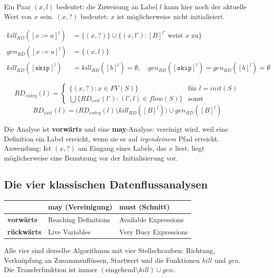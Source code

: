 \documentclass[12pt, a4paper]{article}
\begin{document}
\begin{definitionbox}
Ein Paar $(x, l)$ bedeutet: die Zuweisung an Label $l$ kann hier noch der aktuelle
Wert von $x$ sein. $(x, ?)$ bedeutet: $x$ ist möglicherweise nicht initialisiert.
\end{definitionbox}

\[
\begin{aligned}
kill_{RD}([x := a]^l) &= \{(x,?)\} \cup \{(x,l') : [B]^{l'} \text{ weist } x \text{ zu}\} \\
gen_{RD}([x := a]^l) &= \{(x,l)\} \\
kill_{RD}([\texttt{skip}]^l) &= kill_{RD}([b]^l) = \emptyset,\quad
gen_{RD}([\texttt{skip}]^l) = gen_{RD}([b]^l) = \emptyset
\end{aligned}
\]

\[
RD_{entry}(l) =
\begin{cases}
\{(x,?) : x \in FV(S)\} & \text{für } l = init(S)\\
\bigcup \{RD_{exit}(l') : (l',l) \in flow(S)\} & \text{sonst}
\end{cases}
\]
\[
RD_{exit}(l) = \bigl(RD_{entry}(l) \setminus kill_{RD}([B]^l)\bigr) \cup gen_{RD}([B]^l)
\]

Die Analyse ist \textbf{vorwärts} und eine \textbf{may}-Analyse: vereinigt wird, weil
eine Definition ein Label erreicht, wenn sie es auf \emph{irgendeinem} Pfad erreicht.
Anwendung: Ist $(x,?)$ am Eingang eines Labels, das $x$ liest, liegt möglicherweise
eine Benutzung vor der Initialisierung vor.

\subsection{Die vier klassischen Datenflussanalysen}

\begin{center}
\begin{tabular}{lll}
\hline
 & \textbf{may} (Vereinigung) & \textbf{must} (Schnitt) \\
\hline
\textbf{vorwärts}  & Reaching Definitions & Available Expressions \\
\textbf{rückwärts} & Live Variables & Very Busy Expressions \\
\hline
\end{tabular}
\end{center}

Alle vier sind derselbe Algorithmus mit vier Stellschrauben: Richtung, Verknüpfung an
Zusammenflüssen, Startwert und die Funktionen $kill$ und $gen$. Die Transferfunktion
ist immer $(\text{eingehend} \setminus kill) \cup gen$.
\end{document}
